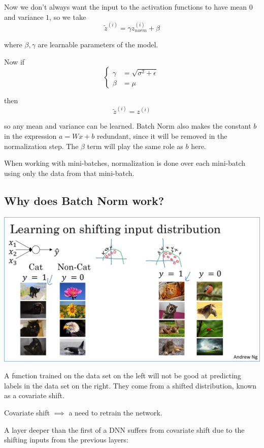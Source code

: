 Now we don't always want the input to the activation functions to have mean $0$ and variance $1$, so we take
\[ \tilde{z}^{(i)}=\gamma z_{norm}^{(i)} + \beta \]

where $\beta, \gamma$ are learnable parameters of the model.

Now if
\[
\begin{cases}
    \gamma &= \sqrt{\sigma^2 + \epsilon} \\
    \beta  &= \mu
\end{cases}
\]

then
\[ \tilde{z}^{(i)} = z^{(i)} \]

so any mean and variance can be learned. Batch Norm also makes the constant $b$ in the expression 
$a=Wx+b$ redundant, since it will be removed in the normalization step. The $\beta$ term will play the same role as $b$ here.

When working with mini-batches, normalization is done over each mini-batch using only the data from that mini-batch.

\subsection*{Why does Batch Norm work?}

\includegraphics[width=\linewidth]{images/learning_on_shifting_distribution.png}

A function trained on the data set on the left will not be good at predicting labels in the data set on the right. 
They come from a shifted distribution, known as a covariate shift.

Covariate shift $\implies$ a need to retrain the network.

A layer deeper than the first of a DNN suffers from covariate shift due to the shifting inputs from the previous layers:

